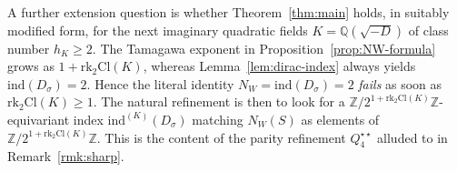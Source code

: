 \documentclass[11pt,a4paper]{article}
\theoremstyle{plain}
\theoremstyle{definition}
\newcommand{\Q}{\mathbb{Q}}
\newcommand{\Z}{\mathbb{Z}}
\newcommand{\rk}{\mathrm{rk}}
\newcommand{\ind}{\mathrm{ind}}
\newcommand{\Cl}{\mathrm{Cl}}
\newcommand{\NW}{N_{W}}
\begin{document}
A further extension question is whether Theorem~\ref{thm:main} holds, in
suitably modified form, for the next imaginary quadratic fields
$K=\Q(\sqrt{-D})$ of class number $h_{K}\geq 2$. The Tamagawa exponent
in Proposition~\ref{prop:NW-formula} grows as
$1+\rk_{2}\Cl(K)$, whereas Lemma~\ref{lem:dirac-index} always yields
$\ind(D_{\sigma})=2$. Hence the literal identity
$\NW=\ind(D_{\sigma})=2$ \emph{fails} as soon as $\rk_{2}\Cl(K)\geq 1$.
The natural refinement is then to look for a $\Z/2^{1+\rk_{2}\Cl(K)}\Z$-equivariant
index $\ind^{(K)}(D_{\sigma})$ matching $\NW(S)$ as elements of
$\Z/2^{1+\rk_{2}\Cl(K)}\Z$. This is the content of the parity refinement
$Q_{4}^{\star\star}$ alluded to in Remark~\ref{rmk:sharp}.

\end{document}
